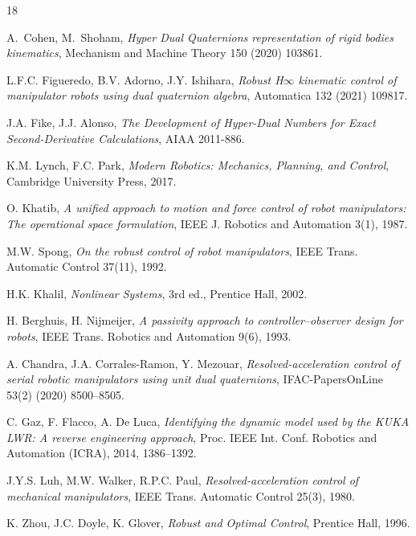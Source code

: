\documentclass[11pt,a4paper]{article}
\theoremstyle{tndqplain}
\theoremstyle{tndqremark}
\begin{document}


\begin{thebibliography}{18}
\raggedright

A.~Cohen, M.~Shoham, \emph{Hyper Dual Quaternions representation of rigid bodies kinematics},
Mechanism and Machine Theory 150 (2020) 103861.

L.F.C. Figueredo, B.V. Adorno, J.Y. Ishihara, \emph{Robust H$\infty$ kinematic control of manipulator robots using dual quaternion algebra},
Automatica 132 (2021) 109817.

J.A. Fike, J.J. Alonso, \emph{The Development of Hyper-Dual Numbers for Exact Second-Derivative Calculations}, AIAA 2011-886.

K.M. Lynch, F.C. Park, \emph{Modern Robotics: Mechanics, Planning, and Control}, Cambridge University Press, 2017.

O. Khatib, \emph{A unified approach to motion and force control of robot manipulators: The operational space formulation},
IEEE J. Robotics and Automation 3(1), 1987.

M.W. Spong, \emph{On the robust control of robot manipulators},
IEEE Trans. Automatic Control 37(11), 1992.

H.K. Khalil, \emph{Nonlinear Systems}, 3rd ed., Prentice Hall, 2002.

H. Berghuis, H. Nijmeijer, \emph{A passivity approach to controller--observer design for robots},
IEEE Trans. Robotics and Automation 9(6), 1993.

A. Chandra, J.A. Corrales-Ramon, Y. Mezouar, \emph{Resolved-acceleration control of serial robotic manipulators using unit dual quaternions},
IFAC-PapersOnLine 53(2) (2020) 8500--8505.

C. Gaz, F. Flacco, A. De Luca, \emph{Identifying the dynamic model used by the KUKA LWR: A reverse engineering approach},
Proc. IEEE Int. Conf. Robotics and Automation (ICRA), 2014, 1386--1392.

J.Y.S. Luh, M.W. Walker, R.P.C. Paul, \emph{Resolved-acceleration control of mechanical manipulators},
IEEE Trans. Automatic Control 25(3), 1980.

K. Zhou, J.C. Doyle, K. Glover, \emph{Robust and Optimal Control}, Prentice Hall, 1996.


\end{thebibliography}
\end{document}
